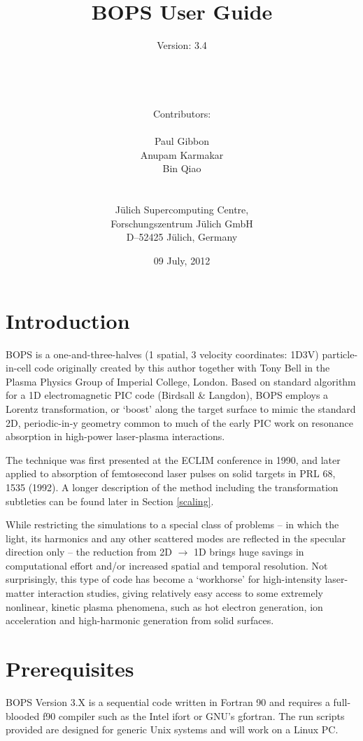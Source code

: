 \documentclass[11pt]{article}
\title{\bf BOPS User Guide\\}
\author{ Version: 3.4 \\ \date{09 July, 2012}
\\ \\ \\
Contributors: \\ \\
Paul Gibbon \\
Anupam Karmakar \\
Bin Qiao \\ \\ \\
J\"ulich Supercomputing Centre,\\
Forschungszentrum J\"ulich GmbH \\
D--52425 J\"ulich, Germany
}
\begin{document}
\maketitle
\pagebreak

\begin{tableofcontents}

\end{tableofcontents}

\pagebreak

\section{Introduction}

BOPS is a one-and-three-halves (1 spatial, 3 velocity coordinates: 1D3V) particle-in-cell code originally created by this author together with Tony Bell in the Plasma Physics Group of Imperial College, London. Based on standard algorithm for a 1D electromagnetic PIC code (Birdsall \& Langdon), BOPS employs a Lorentz transformation, or `boost' along the target surface to mimic the standard 2D, periodic-in-y geometry common to much of the early PIC work on resonance absorption in high-power laser-plasma interactions. 

The technique was first presented at the ECLIM conference in 1990, and later applied to absorption of femtosecond laser pulses on solid targets in PRL 68, 1535 (1992). A longer description of the method including the transformation subtleties can be found later in Section \ref{scaling}.

 While restricting the simulations to a special class of problems -- in which the light, its harmonics and any other scattered modes are reflected in the specular direction only -- the reduction from 2D $\rightarrow$ 1D brings huge savings in computational effort and/or increased spatial and temporal resolution. Not surprisingly, this type of code has become a `workhorse' for high-intensity laser-matter interaction studies, giving relatively easy access to some extremely nonlinear, kinetic plasma phenomena, such as hot electron generation, ion acceleration and high-harmonic generation from solid surfaces.


\section{Prerequisites}

BOPS Version 3.X is a sequential code written in Fortran 90 and requires a full-blooded f90 compiler such as the Intel ifort or GNU's gfortran.  The run scripts provided are designed for generic Unix systems and will work on a Linux PC. 
\end{document}
